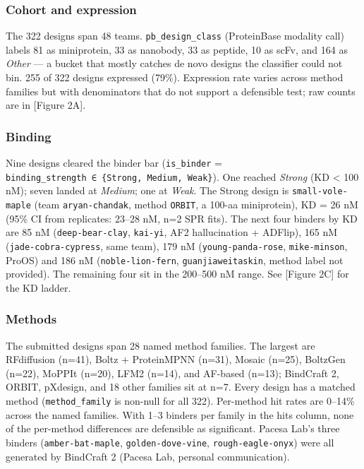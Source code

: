 \hypertarget{cohort-and-expression}{%
\subsubsection{Cohort and expression}\label{cohort-and-expression}}

The 322 designs span 48 teams. \texttt{pb\_design\_class} (ProteinBase
modality call) labels 81 as miniprotein, 33 as nanobody, 33 as peptide,
10 as scFv, and 164 as \emph{Other} --- a bucket that mostly catches de
novo designs the classifier could not bin. 255 of 322 designs expressed
(79\%). Expression rate varies across method families but with
denominators that do not support a defensible test; raw counts are in
{[}Figure 2A{]}.

\hypertarget{binding}{%
\subsubsection{Binding}\label{binding}}

Nine designs cleared the binder bar (\texttt{is\_binder} =
\texttt{binding\_strength\ ∈\ \{Strong,\ Medium,\ Weak\}}). One reached
\emph{Strong} (KD \textless{} 100 nM); seven landed at \emph{Medium};
one at \emph{Weak}. The Strong design is \texttt{small-vole-maple} (team
\texttt{aryan-chandak}, method \texttt{ORBIT}, a 100-aa miniprotein), KD
= 26 nM (95\% CI from replicates: 23--28 nM, n=2 SPR fits). The next
four binders by KD are 85 nM (\texttt{deep-bear-clay}, \texttt{kai-yi},
AF2 hallucination + ADFlip), 165 nM (\texttt{jade-cobra-cypress}, same
team), 179 nM (\texttt{young-panda-rose}, \texttt{mike-minson}, ProOS)
and 186 nM (\texttt{noble-lion-fern}, \texttt{guanjiaweitaskin}, method
label not provided). The remaining four sit in the 200--500 nM range.
See {[}Figure 2C{]} for the KD ladder.

\hypertarget{methods}{%
\subsubsection{Methods}\label{methods}}

The submitted designs span 28 named method families. The largest are
RFdiffusion (n=41), Boltz + ProteinMPNN (n=31), Mosaic (n=25), BoltzGen
(n=22), MoPPIt (n=20), LFM2 (n=14), and AF-based (n=13); BindCraft 2,
ORBIT, pXdesign, and 18 other families sit at n=7. Every design has a
matched method (\texttt{method\_family} is non-null for all 322).
Per-method hit rates are 0--14\% across the named families. With 1--3
binders per family in the hits column, none of the per-method
differences are defensible as significant. Pacesa Lab's three binders
(\texttt{amber-bat-maple}, \texttt{golden-dove-vine},
\texttt{rough-eagle-onyx}) were all generated by BindCraft 2 (Pacesa
Lab, personal communication).

